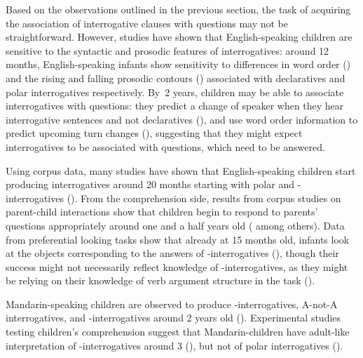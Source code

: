 \noindent Based on the observations outlined in the previous section, the task of acquiring the association of interrogative clauses with questions may not be straightforward. However, studies have shown that English-speaking children are sensitive to the syntactic and prosodic features of interrogatives:  around 12 months, English-speaking infants show sensitivity to differences in word order (\citealt{geffenmintz2015wordorder}) and the rising and falling prosodic contours (\citealt{soderstrom2011,Hay2019}) associated with declaratives and polar interrogatives respectively. By~2 years, children may be able to associate interrogatives with questions: they predict a change of speaker when they hear interrogative sentences and not declaratives (\citealt{casillas2013, casillas2017turn}), and use word order information to predict upcoming turn changes (\citealt{casillas2013, casillas2017turn,lammertink2015turn}), suggesting that they might expect interrogatives to be associated with questions, which need to be answered.

Using corpus data, many studies have shown that English-speaking children start producing interrogatives around 20 months starting with polar and \twh-interrogatives (\citealt{tyack1977, stromswold1995, rowland2003cdswh}). From the comprehension side, results from corpus studies on parent-child interactions show that children begin to respond to parents’ questions appropriately around one and a half years old (\citealt{ervintripp1978, steffensen1978, shatz1978comprehension, shatz1978communicative, berningergarvey1981, shatzmccloskey1984, clark2015turn, moradlou2020} among others). Data from preferential looking tasks show that already at 15 months old, infants look at the objects corresponding to the answers of \twh-interrogatives (\citealt{seidl2003wh, gagliardi2016wh, perkins2020filler}), though their success might not necessarily reflect knowledge of \twh-interrogatives, as they might be relying on their knowledge of verb argument structure in the task (\citealt{perkins2019}).

Mandarin-speaking children are observed to produce \ma-interrogatives, A-not-A interrogatives, and \twh-interrogatives around 2 years old (\citealt{miao1986acq, miao1992, lee1989acq, litang1991int, lichen1997compprod, lichen1997comp, fan2012, lijingwong2017}). Experimental studies testing children’s comprehension suggest that Mandarin-children have adult-like interpretation of \twh-interrogatives around 3 (\citealt{fahn2003acq}), but not of polar interrogatives (\citealt{moradlou2020}). 


